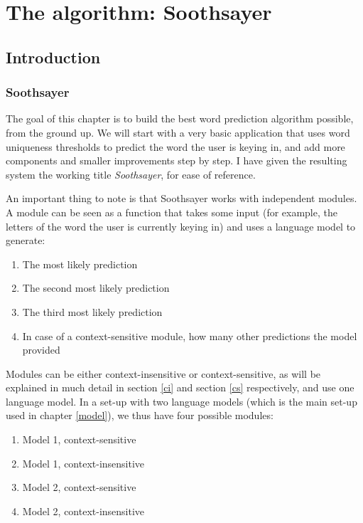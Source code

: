 \documentclass[12pt]{article}
\let\stdsection\section
\renewcommand\section{\newpage\stdsection}
\begin{document}






\section{The algorithm: Soothsayer}

\subsection{Introduction}

\subsubsection{Soothsayer}
The goal of this chapter is to build the best word prediction algorithm possible, from the ground up. We will start with a very basic application that uses word uniqueness thresholds to predict the word the user is keying in, and add more components and smaller improvements step by step. I have given the resulting system the working title \emph{Soothsayer}, for ease of reference.

An important thing to note is that Soothsayer works with independent modules. A module can be seen as a function that takes some input (for example, the letters of the word the user is currently keying in) and uses a language model to generate:

\begin{enumerate}
\item The most likely prediction
\item The second most likely prediction
\item The third most likely prediction
\item In case of a context-sensitive module, how many other predictions the model provided
\end{enumerate}

Modules can be either context-insensitive or context-sensitive, as will be explained in much detail in section \ref{ci} and section \ref{cs} respectively, and use one language model. In a set-up with two language models (which is the main set-up used in chapter \ref{model}), we thus have four possible modules:

\begin{enumerate}
\item Model 1, context-sensitive
\item Model 1, context-insensitive
\item Model 2, context-sensitive
\item Model 2, context-insensitive
\end{enumerate}
\end{document}
